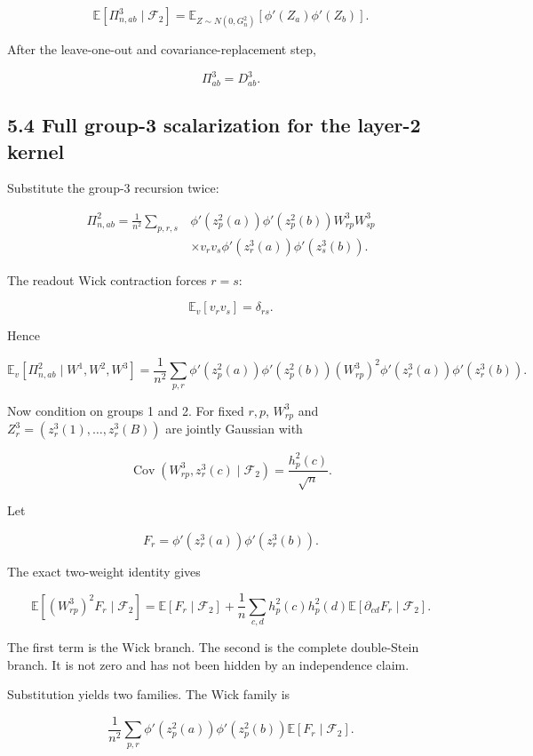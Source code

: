 \[
\mathbb E[\Pi^3_{n,ab}\mid\mathcal F_2]
=
\mathbb E_{Z\sim N(0,G^2_n)}
[\phi'(Z_a)\phi'(Z_b)].
\]


After the leave-one-out and covariance-replacement step,

\[
\Pi^3_{ab}=D^3_{ab}.
\]


\subsection*{5.4 Full group-3 scalarization for the layer-2 kernel}


Substitute the group-3 recursion twice:

\[
\begin{aligned}
\Pi^2_{n,ab}
=
\frac1{n^2}
\sum_{p,r,s}
&\phi'(z_p^2(a))\phi'(z_p^2(b))
W^3_{rp}W^3_{sp}
\\
&\times
v_rv_s
\phi'(z_r^3(a))\phi'(z_s^3(b)).
\end{aligned}
\]


The readout Wick contraction forces \(r=s\):

\[
\mathbb E_v[v_rv_s]=\delta_{rs}.
\]


Hence

\[
\mathbb E_v[\Pi^2_{n,ab}\mid W^1,W^2,W^3]
=
\frac1{n^2}\sum_{p,r}
\phi'(z_p^2(a))\phi'(z_p^2(b))
(W^3_{rp})^2
\phi'(z_r^3(a))\phi'(z_r^3(b)).
\]


Now condition on groups 1 and 2. For fixed \(r,p\),
\(W^3_{rp}\) and \(Z_r^3=(z_r^3(1),\ldots,z_r^3(B))\) are jointly
Gaussian with

\[
\operatorname{Cov}(W^3_{rp},z_r^3(c)\mid\mathcal F_2)
=
\frac{h_p^2(c)}{\sqrt n}.
\]


Let

\[
F_r
=
\phi'(z_r^3(a))\phi'(z_r^3(b)).
\]


The exact two-weight identity gives

\[
\mathbb E[(W^3_{rp})^2F_r\mid\mathcal F_2]
=
\mathbb E[F_r\mid\mathcal F_2]
+
\frac1n
\sum_{c,d}
h_p^2(c)h_p^2(d)
\mathbb E[\partial_{cd}F_r\mid\mathcal F_2].
\]


The first term is the Wick branch. The second is the complete double-Stein
branch. It is not zero and has not been hidden by an independence claim.

Substitution yields two families. The Wick family is

\[
\frac1{n^2}\sum_{p,r}
\phi'(z_p^2(a))\phi'(z_p^2(b))
\mathbb E[F_r\mid\mathcal F_2].
\]


